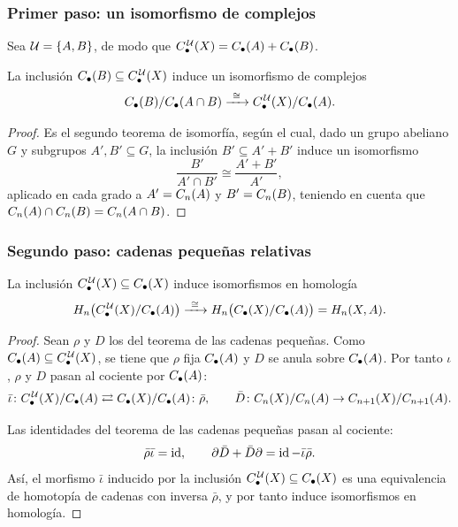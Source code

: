 \begin{frame}
  \frametitle{Primer paso: un isomorfismo de complejos}

  Sea $\mathcal{U}=\{A,B\}$, de modo que
  $C^{\mkern2mu\mathcal{U}}_\bullet(X)=C_\bullet(A)+C_\bullet(B)$.

  \begin{lemma}
    La inclusión $C_\bullet(B)\subseteq C^{\mkern2mu\mathcal{U}}_\bullet(X)$ induce un isomorfismo de complejos
    \[
      C_\bullet(B)/C_\bullet(A\cap B)
      \xrightarrow{\ \cong\ }
      C^{\mkern2mu\mathcal{U}}_\bullet(X)/C_\bullet(A).
    \]
  \end{lemma}

  \begin{proof}
    Es el segundo teorema de isomorfía, según el cual, dado un grupo abeliano $G$ y subgrupos $A',B'\subseteq G$, la inclusión $B'\subseteq A'+B'$ induce un isomorfismo
    \[
      \frac{B'}{A'\cap B'}\cong\frac{A'+B'}{A'},
    \]
    aplicado en cada grado a
    $A'=C_n(A)$ y $B'=C_n(B)$, teniendo en cuenta que
    $C_n(A)\cap C_n(B)=C_n(A\cap B)$. 
  \end{proof}
\end{frame}

\begin{frame}[allowframebreaks]
  \frametitle{Segundo paso: cadenas pequeñas relativas}

  \begin{lemma}
    La inclusión $C^{\mkern2mu\mathcal{U}}_\bullet(X)\subseteq C_\bullet(X)$ induce isomorfismos en homología
    \[
      H_n\bigl(C^{\mkern2mu\mathcal{U}}_\bullet(X)/C_\bullet(A)\bigr)
      \xrightarrow{\ \cong\ }
      H_n\bigl(C_\bullet(X)/C_\bullet(A)\bigr)=H_n(X,A).
    \]
  \end{lemma}

  \begin{proof}
    Sean $\rho$ y $D$ los del teorema de las cadenas pequeñas. Como
    $C_\bullet(A)\subseteq C^{\mkern2mu\mathcal{U}}_\bullet(X)$, se tiene que $\rho$ fija
    $C_\bullet(A)$ y $D$ se anula sobre $C_\bullet(A)$. Por tanto
    $\iota$, $\rho$ y $D$ pasan al cociente por $C_\bullet(A)$:
    \[
      \bar\iota\colon C^{\mkern2mu\mathcal{U}}_\bullet(X)/C_\bullet(A)
        \rightleftarrows C_\bullet(X)/C_\bullet(A)\colon\bar\rho,
      \qquad
      \bar D\colon C_n(X)/C_n(A)\to C_{n+1}(X)/C_{n+1}(A).
    \]

    \framebreak

    Las identidades del teorema de las cadenas pequeñas pasan al cociente:
    \[
      \bar\rho\bar\iota=\operatorname{id},
      \qquad
      \partial\bar D+\bar D\partial=\operatorname{id}-\bar\iota\bar\rho.
    \]
    Así, el morfismo $\bar\iota$ inducido por la inclusión $C^{\mkern2mu\mathcal{U}}_\bullet(X)\subseteq C_\bullet(X)$ es una equivalencia de homotopía de cadenas con inversa
    $\bar\rho$, y por tanto induce isomorfismos en homología.
  \end{proof}
\end{frame}

